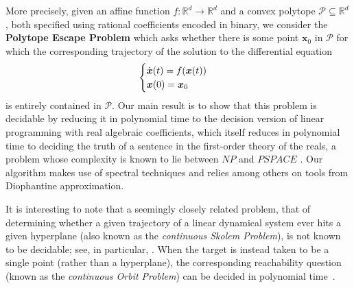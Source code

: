 More precisely, given an affine function
$f:\mathbb{R}^{d}\rightarrow \mathbb{R}^{d}$ and a convex polytope
$\mathcal{P}\subseteq\mathbb{R}^d$, both specified using rational
coefficients encoded in binary, we consider the \textbf{Polytope
  Escape Problem} which asks whether there is some point
$\boldsymbol{x}_0$ in $\mathcal{P}$ for which the corresponding
trajectory of the solution to the differential equation
\begin{equation*}
\begin{displaystyle} \begin{cases}
\dot{\boldsymbol{x}}(t)=f(\boldsymbol{x}(t)) \\
\boldsymbol{x}(0)=\boldsymbol{x}_{0}
\end{cases} \end{displaystyle}
\end{equation*}
is entirely contained in $\mathcal{P}$. Our main result is to show
that this problem is decidable by reducing it in polynomial time to
the decision version of linear programming with real algebraic
coefficients, which itself reduces in polynomial time to deciding the
truth of a sentence in the first-order theory of the reals, a problem
whose complexity is known to lie between $\mathit{NP}$ and
$\mathit{PSPACE}$ \cite{Canny88}. Our algorithm makes use of spectral
techniques and relies among others on tools from Diophantine
approximation.

It is interesting to note that a seemingly closely related problem,
that of determining whether a given trajectory of a linear dynamical
system ever hits a given hyperplane (also known as the
\emph{continuous Skolem Problem}), is not known to be decidable; see,
in particular, \cite{BellDJB10,COW16a:ICALP16,COW16b:LICS16}. When the
target is instead taken to be a single point (rather than a
hyperplane), the corresponding reachability question (known as the
\emph{continuous Orbit Problem}) can be decided in polynomial
time~\cite{Hainry08}.
